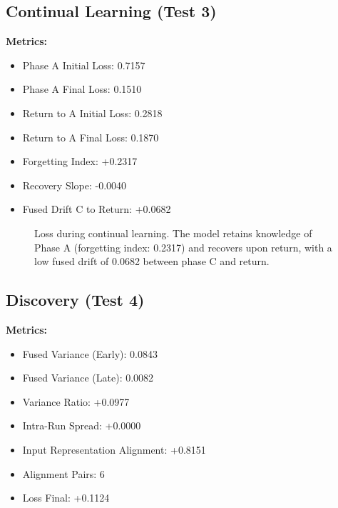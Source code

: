 \documentclass[12pt]{article}
\begin{document}
\subsection{Continual Learning (Test 3)}
\label{subsec:test3}

\textbf{Metrics:}
\begin{itemize}
    \item Phase A Initial Loss: 0.7157
    \item Phase A Final Loss: 0.1510
    \item Return to A Initial Loss: 0.2818
    \item Return to A Final Loss: 0.1870
    \item Forgetting Index: +0.2317
    \item Recovery Slope: -0.0040
    \item Fused Drift C to Return: +0.0682
\end{itemize}

\begin{figure}[H]
\centering
{}
\caption{Loss during continual learning. The model retains knowledge
of Phase A (forgetting index: 0.2317) and recovers upon return,
with a low fused drift of 0.0682 between phase C and return.}
\label{fig:continual}
\end{figure}

\subsection{Discovery (Test 4)}
\label{subsec:test4}

\textbf{Metrics:}
\begin{itemize}
    \item Fused Variance (Early): 0.0843
    \item Fused Variance (Late): 0.0082
    \item Variance Ratio: +0.0977
    \item Intra-Run Spread: +0.0000
    \item Input Representation Alignment: +0.8151
    \item Alignment Pairs: 6
    \item Loss Final: +0.1124
\end{itemize}
\end{document}
